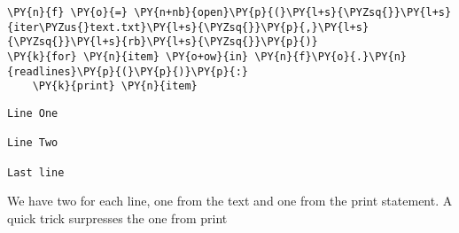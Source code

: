 
{\par%
\vspace{-1\baselineskip}%
}%
\begin{notebookcell}[45]%
\begin{addmargin}[\cellleftmargin]{0em}%
{\smaller%
\par%
%
\vspace{-1\smallerfontscale}%
\begin{Verbatim}[commandchars=\\\{\}]
\PY{n}{f} \PY{o}{=} \PY{n+nb}{open}\PY{p}{(}\PY{l+s}{\PYZsq{}}\PY{l+s}{iter\PYZus{}text.txt}\PY{l+s}{\PYZsq{}}\PY{p}{,}\PY{l+s}{\PYZsq{}}\PY{l+s}{rb}\PY{l+s}{\PYZsq{}}\PY{p}{)}
\PY{k}{for} \PY{n}{item} \PY{o+ow}{in} \PY{n}{f}\PY{o}{.}\PY{n}{readlines}\PY{p}{(}\PY{p}{)}\PY{p}{:}
    \PY{k}{print} \PY{n}{item}
\end{Verbatim}
%
\par%
\vspace{-1\smallerfontscale}}%
\end{addmargin}
\end{notebookcell}

\par\vspace{1\smallerfontscale}%
    \begin{addmargin}[\cellleftmargin]{0em}%
    {\smaller%
    \vspace{-1\smallerfontscale}%
    
    \begin{Verbatim}[commandchars=\\\{\}]
Line One

Line Two

Last line
    \end{Verbatim}
}%
    \end{addmargin}%
    We have two \n for each line, one from the text and one from the print
statement. A quick trick surpresses the one from print


